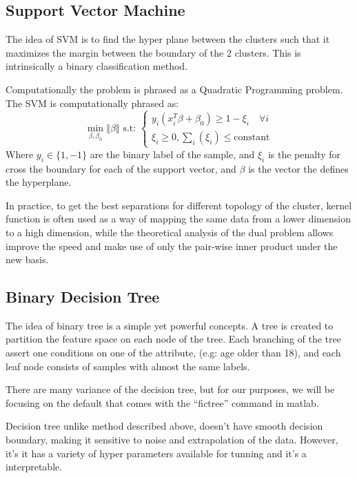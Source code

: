 \documentclass{article}
\begin{document}
    \subsection{Support Vector Machine}
        \hspace{1.1em}
        The idea of SVM is to find the hyper plane between the clusters such that it maximizes the margin between the boundary of the 2 clusters. This is intrinsically a binary classification method\cite{scikit-learn}. 
        \par
        Computationally the problem is phrased as a Quadratic Programming problem. The SVM is computationally phrased as\cite{stats_book_419}: 
        \begin{equation*}\tag{7}\label{eqn:7}
            \min_{\beta, \beta_0} \left\Vert
                 \beta
            \right\Vert \text{ s.t: } 
            \begin{cases}
                y_i(x_i^T\beta + \beta_0) \ge 1 - \xi_i \quad \forall i
                \\
                \xi_i \ge 0, \sum_{i}^{}\left(\xi_i\right) \le \text{constant}
            \end{cases}
        \end{equation*}
        Where $y_i\in \{1, -1\}$ are the binary label of the sample, and $\xi_i$ is the penalty for cross the boundary for each of the support vector, and $\beta$ is the vector the defines the hyperplane. 
        \par
        In practice, to get the best separations for different topology of the cluster, kernel function is often used as a way of mapping the same data from a lower dimension to a high dimension, while the theoretical analysis of the dual problem allows improve the speed and make use of only the pair-wise inner product under the new basis\cite{stats_book_424}. 

    \subsection{Binary Decision Tree}
        \hspace{1.1em}
        The idea of binary tree is a simple yet powerful concepts. A tree is created to partition the feature space on each node of the tree. Each branching of the tree assert one conditions on one of the attribute, (e.g: age older than 18), and each leaf node consists of samples with almost the same labels. 
        \par
        There are many variance of the decision tree, but for our purposes, we will be focusing on the default that comes with the ``fictree'' command in matlab\cite{MathWorks-fitctree}. 
        \par
        Decision tree unlike method described above, doesn't have smooth decision boundary, making it sensitive to noise and extrapolation of the data. However, it's it has a variety of hyper parameters available for tunning and it's a interpretable\cite{steven}.
\end{document}
